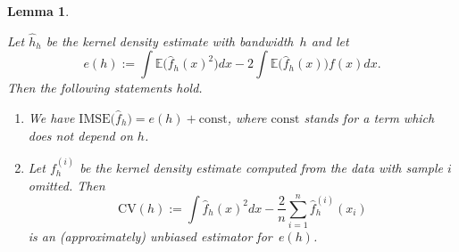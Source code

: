 \documentclass[
  a4paper,
]{article}
\newtheorem{lemma}{Lemma}[section]
\theoremstyle{definition}
\theoremstyle{definition}
\theoremstyle{definition}
\theoremstyle{definition}
\theoremstyle{remark}
\begin{document}
\begin{lemma}
\protect\hypertarget{lem:KDE-XV}{}\label{lem:KDE-XV}

Let \(\hat h_h\) be the kernel density estimate with bandwidth~\(h\)
and let
\begin{equation*}
  e(h)
  := \int \mathbb{E}\bigl( \hat f_h(x)^2 \bigr) dx - 2 \int \mathbb{E}\bigl( \hat f_h(x) \bigr) f(x) dx.
\end{equation*}
Then the following statements hold.

\begin{enumerate}
\def\labelenumi{(\alph{enumi})}
\item
  We have
  \(\mathrm{IMSE}\bigl( \hat f_h \bigr) = e(h) + \mathrm{const}\),
  where \(\mathrm{const}\) stands for a term which does not depend on \(h\).
\item
  Let \(f_h^{(i)}\) be the kernel density estimate computed from the data
  with sample \(i\) omitted.
  Then
  \begin{equation*}
    \mathrm{CV}(h)
    := \int \hat f_h(x)^2 dx - \frac{2}{n}\sum_{i=1}^n \hat f_h^{(i)}(x_i)
  \end{equation*}
  is an (approximately) unbiased estimator for~\(e(h)\).
\end{enumerate}

\end{lemma}
\end{document}
